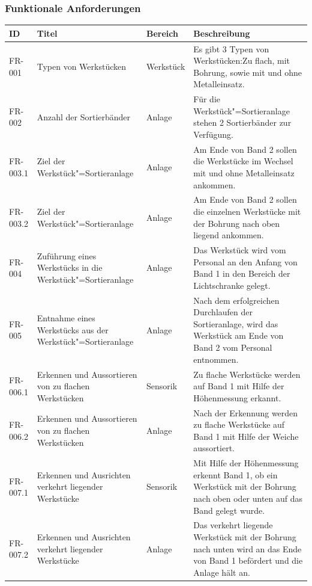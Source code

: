 \documentclass[oneside,a4paper,titlepage]{scrartcl} %
\begin{document}
\subsubsection{Funktionale Anforderungen}
\begin{small}
 \begin{longtable}{|C{2cm}|L{4cm}|C{1.5cm}|L{5.5cm}|}
  \hline
  \textbf{ID} & \textbf{Titel} & \textbf{Bereich} & \textbf{Beschreibung}\\
  \toprule
  \endhead
  \hline
  FR-001 & Typen von Werkstücken & Werkstück & Es gibt 3 Typen von Werkstücken:Zu flach, mit Bohrung, sowie mit und ohne Metalleinsatz.\\
  \hline
   FR-002 & Anzahl der Sortierbänder & Anlage & Für die Werkstück"=Sortieranlage stehen 2 Sortierbänder zur Verfügung.\\
  \hline
  FR-003.1 & Ziel der Werkstück"=Sortieranlage & Anlage & Am Ende von Band 2 sollen die Werkstücke im Wechsel mit und ohne Metalleinsatz ankommen.\\
  \hline
  FR-003.2 & Ziel der Werkstück"=Sortieranlage & Anlage & Am Ende von Band 2 sollen die einzelnen Werkstücke mit der Bohrung nach oben liegend ankommen.\\
  \hline
   FR-004 & Zuführung eines Werkstücks in die Werkstück"=Sortieranlage & Anlage & Das Werkstück wird vom Personal an den Anfang von Band 1 in den Bereich der Lichtschranke gelegt.\\
  \hline
  FR-005 & Entnahme eines Werkstücks aus der Werkstück"=Sortieranlage & Anlage & Nach dem erfolgreichen Durchlaufen der Sortieranlage, wird das Werkstück am Ende von Band 2 vom Personal entnommen.\\
  \hline
   FR-006.1 & Erkennen und Aussortieren von zu flachen Werkstücken & Sensorik & Zu flache Werkstücke werden auf Band 1 mit Hilfe der Höhenmessung erkannt.\\
  \hline
   FR-006.2 & Erkennen und Aussortieren von zu flachen Werkstücken & Anlage & Nach der Erkennung werden zu flache Werkstücke auf Band 1 mit Hilfe der Weiche aussortiert.\\
  \hline
  FR-007.1 & Erkennen und Ausrichten verkehrt liegender Werkstücke & Sensorik & Mit Hilfe der Höhenmessung erkennt Band 1, ob ein Werkstück mit der Bohrung nach oben oder unten auf das Band gelegt wurde.\\
  \hline
  FR-007.2 & Erkennen und Ausrichten verkehrt liegender Werkstücke & Anlage & Das verkehrt liegende Werkstück mit der Bohrung nach unten wird an das Ende von Band 1 befördert und die Anlage hält an.\\

\end{longtable}
\end{small}
\end{document}
